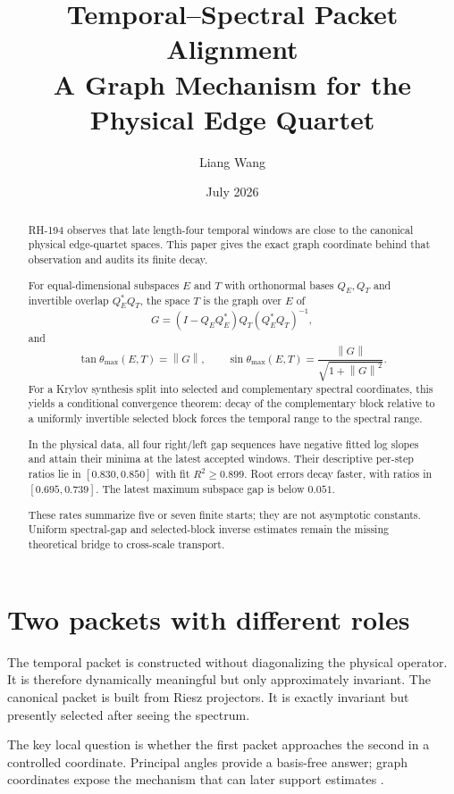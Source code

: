 \documentclass[12pt]{article}
\title{Temporal--Spectral Packet Alignment\\
\large A Graph Mechanism for the Physical Edge Quartet}
\author{Liang Wang}
\date{July 2026}
\theoremstyle{remark}
\newcommand{\norm}[1]{\left\lVert#1\right\rVert}
\begin{document}
\maketitle

\begin{abstract}
RH-194 observes that late length-four temporal windows are close to the
canonical physical edge-quartet spaces.  This paper gives the exact graph
coordinate behind that observation and audits its finite decay.

For equal-dimensional subspaces $E$ and $T$ with orthonormal bases $Q_E,Q_T$
and invertible overlap $Q_E^*Q_T$, the space $T$ is the graph over $E$ of
\[
 G=(I-Q_EQ_E^*)Q_T(Q_E^*Q_T)^{-1},
\]
and
\[
 \tan\theta_{\max}(E,T)=\norm G,
 \qquad
 \sin\theta_{\max}(E,T)=\frac{\norm G}{\sqrt{1+\norm G^2}}.
\]
For a Krylov synthesis split into selected and complementary spectral
coordinates, this yields a conditional convergence theorem: decay of the
complementary block relative to a uniformly invertible selected block forces
the temporal range to the spectral range.

In the physical data, all four right/left gap sequences have negative fitted
log slopes and attain their minima at the latest accepted windows.  Their
descriptive per-step ratios lie in $[0.830,0.850]$ with fit
$R^2\ge0.899$.  Root errors decay faster, with ratios in
$[0.695,0.739]$.  The latest maximum subspace gap is below $0.051$.

These rates summarize five or seven finite starts; they are not asymptotic
constants.  Uniform spectral-gap and selected-block inverse estimates remain
the missing theoretical bridge to cross-scale transport.
\end{abstract}

\section{Two packets with different roles}

The temporal packet is constructed without diagonalizing the physical
operator.  It is therefore dynamically meaningful but only approximately
invariant.  The canonical packet is built from Riesz projectors.  It is
exactly invariant but presently selected after seeing the spectrum.

The key local question is whether the first packet approaches the second in
a controlled coordinate.  Principal angles provide a basis-free answer;
graph coordinates expose the mechanism that can later support estimates
\citep{StewartSun1990}.
\end{document}
